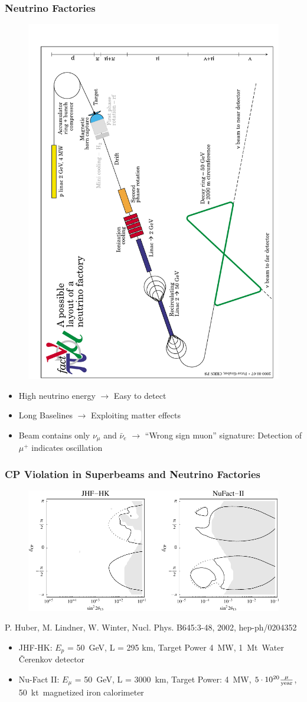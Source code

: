 \documentclass{beamer}
\newcommand{\reference}[1]{\tiny #1 \normalsize}
\begin{document}
\begin{frame}
  \frametitle{Neutrino Factories}
  \begin{figure}
    \vspace{-0.8 cm}
    \includegraphics[height=8 cm,angle=270]{fig/cern_nufact.pdf}
    \vspace{-0.2 cm}
  \end{figure}
  \begin{itemize}
    \item High neutrino energy $\longrightarrow$ Easy to detect
    \item Long Baselines $\longrightarrow$ Exploiting matter effects
    \item Beam contains only $\nu_\mu$ and $\bar{\nu}_e$
          $\longrightarrow$ ``Wrong sign muon'' signature:
          Detection of $\mu^+$ indicates oscillation
  \end{itemize}
\end{frame}

\begin{frame}
  \frametitle{CP Violation in Superbeams and Neutrino Factories}
  \begin{figure}
    \includegraphics[height=4.5 cm]{fig/cpviolation.pdf}
  \end{figure}
  \begin{flushright}
    \reference{P. Huber, M. Lindner, W. Winter, Nucl. Phys. B645:3-48, 2002, hep-ph/0204352}
  \end{flushright}
  \begin{itemize}
    \item JHF-HK: $E_p$ = 50~GeV, L = 295 km, Target Power 4~MW, 1~Mt~Water \v{C}erenkov detector
    \item Nu-Fact II: $E_\mu$ = 50~GeV, L = 3000~km, Target Power: 4~MW,
                      $5 \cdot 10^{20} \frac{\mu}{\textnormal{year}}$, 50~kt~magnetized iron calorimeter
  \end{itemize}
\end{frame}
\end{document}
